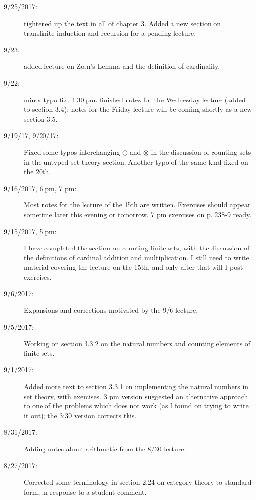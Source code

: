 \documentclass[12pt]{book}
\begin{document}
{\begin{description}
\item[9/25/2017:]  tightened up the text in all of chapter 3.  Added a new section on transfinite induction and recursion for a pending lecture.

\item[9/23:]  added lecture on Zorn's Lemma and the definition of cardinality.

\item[9/22:]  minor typo fix.  4:30 pm:  finished notes for the Wednesday lecture (added to section 3.4); notes for the Friday lecture will be coming shortly as a new section 3.5.

\item[9/19/17, 9/20/17:]  Fixed some typos interchanging $\oplus$ and $\otimes$ in the discussion of counting sets in the untyped set theory section.  Another typo of the same kind fixed on the 20th.

\item[9/16/2017, 6 pm, 7 pm:]  Most notes for the lecture of the 15th are written.  Exercises should appear sometime later this evening or tomorrow.  7 pm exercises on p. 238-9 ready.

\item[9/15/2017, 5 pm:]  I have completed the section on counting finite sets, with the discussion of the definitions of cardinal addition and multiplication.  I still need to write material covering the lecture on the 15th, and only after that will I post exercises.

\item[9/6/2017:]  Expansions and corrections motivated by the 9/6 lecture.

\item[9/5/2017:]  Working on section 3.3.2 on the natural numbers and counting elements of finite sets.

\item[9/1/2017:]  Added more text to section 3.3.1 on implementing the natural numbers in set theory, with exercises.  3 pm version suggested an alternative approach to one of the problems which does not work (as I found on trying to write it out);  the 3:30 version corrects this.

\item[8/31/2017:]  Adding notes about arithmetic from the 8/30 lecture.

\item[8/27/2017:]  Corrected some terminology in section 2.24 on category theory to standard form, in response to a student comment.


\end{description}}
\end{document}
